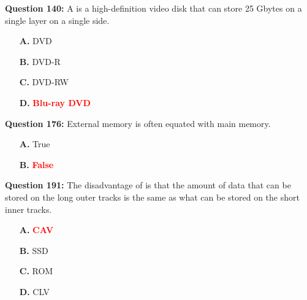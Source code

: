 \documentclass[12pt,a4paper]{article}
\begin{document}
\vspace{0.5cm}

\textbf{Question 140:} A \underline{\hspace{1.5cm}} is a high-definition video disk that can store 25 Gbytes on a single layer on a single side.

\begin{itemize}
    \item[\textbf{A.}] DVD
    \item[\textbf{B.}] DVD-R
    \item[\textbf{C.}] DVD-RW
    \item[\textbf{D.}] \textcolor{red}{\textbf{Blu-ray DVD}}
\end{itemize}

\vspace{0.5cm}

\vspace{0.5cm}

\textbf{Question 176:} External memory is often equated with main memory.

\begin{itemize}
    \item[\textbf{A.}] True
    \item[\textbf{B.}] \textcolor{red}{\textbf{False}}
\end{itemize}

\vspace{0.5cm}

\vspace{0.5cm}

\textbf{Question 191:} The disadvantage of \underline{\hspace{1.5cm}} is that the amount of data that can be stored on the long outer tracks is the same as what can be stored on the short inner tracks.

\begin{itemize}
    \item[\textbf{A.}] \textcolor{red}{\textbf{CAV}}
    \item[\textbf{B.}] SSD
    \item[\textbf{C.}] ROM
    \item[\textbf{D.}] CLV
\end{itemize}

\vspace{0.5cm}

\vspace{0.5cm}

\vspace{0.5cm}
\end{document}
